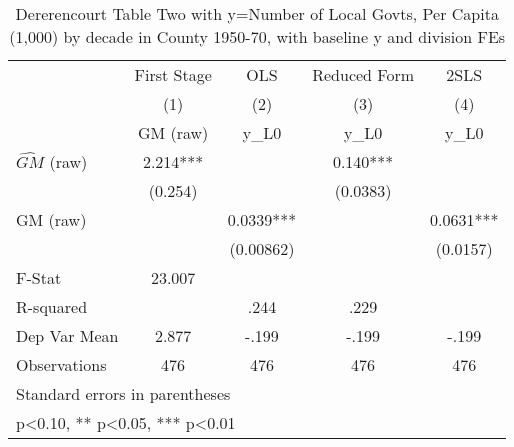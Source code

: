 \begin{table}[htbp]\centering
\def\sym#1{\ifmmode^{#1}\else\(^{#1}\)\fi}
\caption{Dererencourt Table Two with y=Number of Local Govts, Per Capita (1,000) by decade in County 1950-70, with baseline y and division FEs}
\begin{tabular}{l*{4}{c}}
\toprule
                    & First Stage   &         OLS   &Reduced Form   &        2SLS   \\
                    &\multicolumn{1}{c}{(1)}&\multicolumn{1}{c}{(2)}&\multicolumn{1}{c}{(3)}&\multicolumn{1}{c}{(4)}\\
                    &\multicolumn{1}{c}{GM  (raw)}&\multicolumn{1}{c}{y\_L0}&\multicolumn{1}{c}{y\_L0}&\multicolumn{1}{c}{y\_L0}\\
\midrule
$\hat{GM}$ (raw)    &       2.214***&               &       0.140***&               \\
                    &     (0.254)   &               &    (0.0383)   &               \\
\addlinespace
GM  (raw)           &               &      0.0339***&               &      0.0631***\\
                    &               &   (0.00862)   &               &    (0.0157)   \\
\midrule
F-Stat              &      23.007   &               &               &               \\
R-squared           &               &        .244   &        .229   &               \\
Dep Var Mean        &       2.877   &       -.199   &       -.199   &       -.199   \\
Observations        &         476   &         476   &         476   &         476   \\
\bottomrule
\multicolumn{5}{l}{\footnotesize Standard errors in parentheses}\\
\multicolumn{5}{l}{\footnotesize * p<0.10, ** p<0.05, *** p<0.01}\\
\end{tabular}
\end{table}
